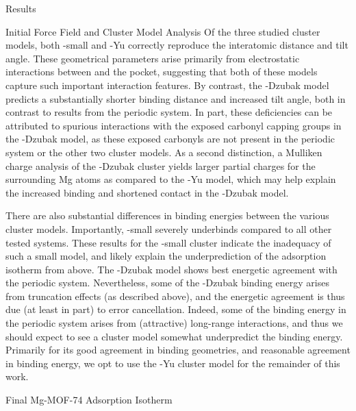 \begin{section}{Results}
\begin{subsection}{Initial Force Field and Cluster Model Analysis}
Of the three studied cluster models, both \mgmof-small and \mgmof-Yu correctly
reproduce the  interatomic distance and  tilt angle. These
geometrical parameters arise primarily from electrostatic interactions between
\co and the  pocket,\cite{Valenzano2010} 
suggesting that both of these models capture such important interaction
features. By contrast, the \mgmof-Dzubak model predicts a substantially shorter binding
distance and increased tilt angle, both in contrast to results from the
periodic system. In part, these deficiencies can be attributed to spurious
\co interactions with the exposed carbonyl capping groups in the \mgmof-Dzubak
model, as these exposed carbonyls are not present in the periodic system or the other two cluster
models. As a second distinction, a Mulliken charge analysis of the 
\mgmof-Dzubak cluster yields larger partial charges for the surrounding Mg
atoms as compared to the \mgmof-Yu model, which may help explain the increased
binding and shortened  contact in the \mgmof-Dzubak model. 

There are also substantial differences in binding energies
between the various cluster models. Importantly, \mgmof-small severely
underbinds
\co compared to all other tested systems.
These results for the \mgmof-small cluster indicate the inadequacy of such a small 
model, and likely explain the underprediction of the \co adsorption isotherm
from above. 
The \mgmof-Dzubak model shows best energetic agreement with the periodic system. 
Nevertheless, some of the \mgmof-Dzubak binding energy arises from 
truncation effects (as described above), and the energetic agreement is thus
due (at least in part) to error cancellation. Indeed, some of the binding
energy in the periodic system arises from (attractive) long-range
interactions, and thus we should expect to see a cluster model somewhat
underpredict the binding energy. 
Primarily for its good agreement in binding geometries, and reasonable
agreement in binding energy, 
we opt to use the \mgmof-Yu cluster model for the remainder of this work.

\end{subsection}
\begin{subsection}{Final Mg-MOF-74 {\co} Adsorption Isotherm}


\end{subsection}
\end{section}
